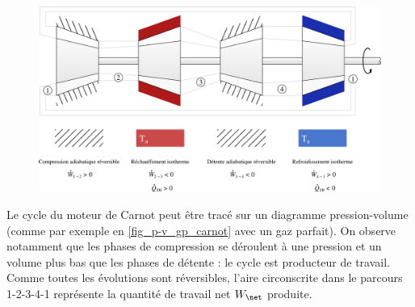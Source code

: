 \begin{landscape}
		\begin{figure}
			\begin{center}
				\includegraphics[width=\linewidth]{images/moteur_carnot_so.png}
			\end{center}
			\label{fig_carnot_quatre_etapes_so}
		\end{figure}

		\end{landscape}


		Le cycle du moteur de Carnot peut être tracé sur un diagramme pression-volume (comme par exemple en \cref{fig_p-v_gp_carnot} avec un gaz parfait). On observe notamment que les phases de compression se déroulent à une pression et un volume plus bas que les phases de détente : le cycle est producteur de travail. Comme toutes les évolutions sont réversibles, l’aire circonscrite dans le parcours 1-2-3-4-1 représente la quantité de travail net $W_\net$ produite.

